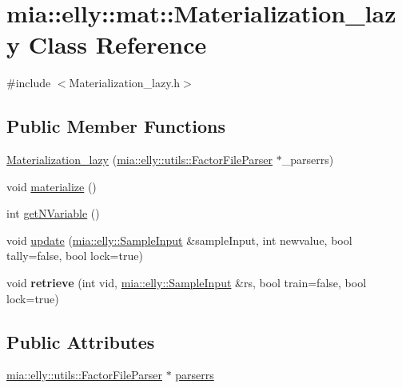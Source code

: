 \hypertarget{classmia_1_1elly_1_1mat_1_1_materialization__lazy}{\section{mia\-:\-:elly\-:\-:mat\-:\-:Materialization\-\_\-lazy Class Reference}
\label{classmia_1_1elly_1_1mat_1_1_materialization__lazy}
}


{\ttfamily \#include $<$Materialization\-\_\-lazy.\-h$>$}

\subsection*{Public Member Functions}
\begin{DoxyCompactItemize}
\item 
\hyperlink{classmia_1_1elly_1_1mat_1_1_materialization__lazy_ab3a242c373540574d1344de869014d3c}{Materialization\-\_\-lazy} (\hyperlink{classmia_1_1elly_1_1utils_1_1_factor_file_parser}{mia\-::elly\-::utils\-::\-Factor\-File\-Parser} $\ast$\-\_\-parserrs)
\item 
void \hyperlink{classmia_1_1elly_1_1mat_1_1_materialization__lazy_abc0e82ad824af5cef8708180fc3bf901}{materialize} ()
\item 
int \hyperlink{classmia_1_1elly_1_1mat_1_1_materialization__lazy_a4666c03c8a226bba1a199a9012c48ff6}{get\-N\-Variable} ()
\item 
void \hyperlink{classmia_1_1elly_1_1mat_1_1_materialization__lazy_a13de851c8bbb02bc4b56317eb5861eb0}{update} (\hyperlink{classmia_1_1elly_1_1_sample_input}{mia\-::elly\-::\-Sample\-Input} \&sample\-Input, int newvalue, bool tally=false, bool lock=true)
\item 
\hypertarget{classmia_1_1elly_1_1mat_1_1_materialization__lazy_aa9ad91dc3357563461402a65d92d643a}{void {\bfseries retrieve} (int vid, \hyperlink{classmia_1_1elly_1_1_sample_input}{mia\-::elly\-::\-Sample\-Input} \&rs, bool train=false, bool lock=true)}\label{classmia_1_1elly_1_1mat_1_1_materialization__lazy_aa9ad91dc3357563461402a65d92d643a}

\end{DoxyCompactItemize}
\subsection*{Public Attributes}
\begin{DoxyCompactItemize}
\item 
\hyperlink{classmia_1_1elly_1_1utils_1_1_factor_file_parser}{mia\-::elly\-::utils\-::\-Factor\-File\-Parser} $\ast$ \hyperlink{classmia_1_1elly_1_1mat_1_1_materialization__lazy_a3425cb0aefa4c9423085c2b164aaacd4}{parserrs}
\end{DoxyCompactItemize}


